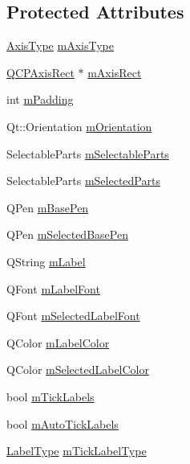 \subsection*{Protected Attributes}
\begin{DoxyCompactItemize}
\item 
\hyperlink{classQCPAxis_ae2bcc1728b382f10f064612b368bc18a}{Axis\+Type} \hyperlink{classQCPAxis_ae704bf9f2c2b026f08dd4ccad79c616e}{m\+Axis\+Type}
\item 
\hyperlink{classQCPAxisRect}{Q\+C\+P\+Axis\+Rect} $\ast$ \hyperlink{classQCPAxis_a6f150b65a202f32936997960e331dfcb}{m\+Axis\+Rect}
\item 
int \hyperlink{classQCPAxis_a52a805a4f03231210e0880db7f77e098}{m\+Padding}
\item 
Qt\+::\+Orientation \hyperlink{classQCPAxis_a048e1792fa86f4f86df55200b3f0be36}{m\+Orientation}
\item 
Selectable\+Parts \hyperlink{classQCPAxis_ab9042d8a095998f27a28b39411d8b9c3}{m\+Selectable\+Parts}
\item 
Selectable\+Parts \hyperlink{classQCPAxis_a8f1eb0abfe2ae64652aa46b360e841e4}{m\+Selected\+Parts}
\item 
Q\+Pen \hyperlink{classQCPAxis_ad6b4a0aee9558fb35529e960b8fef72d}{m\+Base\+Pen}
\item 
Q\+Pen \hyperlink{classQCPAxis_a80baa4e3c16f9b6edf3eccacd2a50fde}{m\+Selected\+Base\+Pen}
\item 
Q\+String \hyperlink{classQCPAxis_ae8001dbdfc47685c1cf7b98b044460e6}{m\+Label}
\item 
Q\+Font \hyperlink{classQCPAxis_a37442d470e30e19b81ecaf979a34d046}{m\+Label\+Font}
\item 
Q\+Font \hyperlink{classQCPAxis_ae48fe3489afadc0b3cd003233e2bf19f}{m\+Selected\+Label\+Font}
\item 
Q\+Color \hyperlink{classQCPAxis_a457a003bb1c2b6ab73e5a173ba7558fd}{m\+Label\+Color}
\item 
Q\+Color \hyperlink{classQCPAxis_a94f57de3ba024471ca206d83cf2258dd}{m\+Selected\+Label\+Color}
\item 
bool \hyperlink{classQCPAxis_a3e4315be072026644e69009557a2fa11}{m\+Tick\+Labels}
\item 
bool \hyperlink{classQCPAxis_a721e496b342f272078c5ff84564e472f}{m\+Auto\+Tick\+Labels}
\item 
\hyperlink{classQCPAxis_a4a7da0166f755f5abac23b765d184cad}{Label\+Type} \hyperlink{classQCPAxis_a6e056c1cb1aab0eddebfebbcb78c8f90}{m\+Tick\+Label\+Type}
\item 

\end{DoxyCompactItemize}
